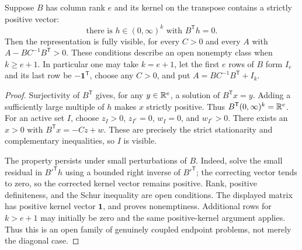 \begin{proposition}\label{prop:positive-span}
Suppose $B$ has column rank $e$ and its kernel on the transpose contains a strictly positive vector:
\[
 \text{there is }h\in(0,\infty)^k\text{ with }B^{\mathsf T}h=0.
\]
Then the representation is fully visible, for every $C>0$ and every $A$ with $A-BC^{-1}B^{\mathsf T}>0$. These conditions describe an open nonempty class when $k\ge e+1$. In particular one may take $k=e+1$, let the first $e$ rows of $B$ form $I_e$ and its last row be $-\mathbf1^{\mathsf T}$, choose any $C>0$, and put $A=BC^{-1}B^{\mathsf T}+I_k$.
\end{proposition}
\begin{proof}
Surjectivity of $B^{\mathsf T}$ gives, for any $y\in\mathbb R^e$, a solution of $B^{\mathsf T}x=y$. Adding a sufficiently large multiple of $h$ makes $x$ strictly positive. Thus $B^{\mathsf T}(0,\infty)^k=\mathbb R^e$.
For an active set $I$, choose $z_I>0$, $z_{I^c}=0$, $w_I=0$, and $w_{I^c}>0$. There exists an $x>0$ with $B^{\mathsf T}x=-Cz+w$. These are precisely the strict stationarity and complementary inequalities, so $I$ is visible.

The property persists under small perturbations of $B$. Indeed, solve the small residual in $B'^{\mathsf T}h$ using a bounded right inverse of $B'^{\mathsf T}$; the correcting vector tends to zero, so the corrected kernel vector remains positive. Rank, positive definiteness, and the Schur inequality are open conditions. The displayed matrix has positive kernel vector $\mathbf1$, and proves nonemptiness. Additional rows for $k>e+1$ may initially be zero and the same positive-kernel argument applies. Thus this is an open family of genuinely coupled endpoint problems, not merely the diagonal case.
\end{proof}

